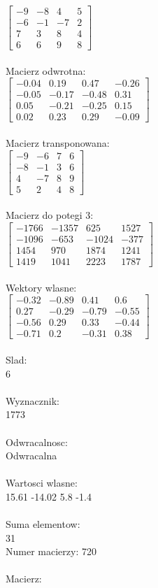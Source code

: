 \documentclass[a4paper,12pt]{article}
\begin{document}
$\begin{bmatrix} -9&-8&4&5\\-6&-1&-7&2\\7&3&8&4\\6&6&9&8 \end{bmatrix}$
\\
\\
Macierz odwrotna:\\

$\begin{bmatrix} -0.04&0.19&0.47&-0.26\\-0.05&-0.17&-0.48&0.31\\0.05&-0.21&-0.25&0.15\\0.02&0.23&0.29&-0.09 \end{bmatrix}$
\\
\\
Macierz transponowana:\\

$\begin{bmatrix} -9&-6&7&6\\-8&-1&3&6\\4&-7&8&9\\5&2&4&8 \end{bmatrix}$
\\
\\
Macierz do potegi 3:\\

$\begin{bmatrix} -1766&-1357&625&1527\\-1096&-653&-1024&-377\\1454&970&1874&1241\\1419&1041&2223&1787 \end{bmatrix}$
\\
\\
Wektory wlasne:\\

$\begin{bmatrix} -0.32&-0.89&0.41&0.6\\0.27&-0.29&-0.79&-0.55\\-0.56&0.29&0.33&-0.44\\-0.71&0.2&-0.31&0.38 \end{bmatrix}$
\\
\\
Slad:\\
6
\\
\\
Wyznacznik:\\
1773
\\
\\
Odwracalnosc:\\
Odwracalna
\\
\\
Wartosci wlasne:\\
15.61 -14.02 5.8 -1.4
\\
\\
Suma elementow:\\
31
\\
\newpage
Numer macierzy:
720
\\
\\
Macierz:\\
\end{document}
